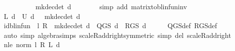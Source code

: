 \begin{isabellebody}
\ \ \ \ \isamarkupfalse%
\ \isamarkupfalse%
\ {\isachardoublequoteopen}{\isasymdots}\ {\isacharequal}{\kern0pt}\ {\isacharparenleft}{\kern0pt}{\isasymP}\ {\isacharparenleft}{\kern0pt}mk{\isacharunderscore}{\kern0pt}dec{\isacharunderscore}{\kern0pt}det\ d{\isacharparenright}{\kern0pt}{\isacharparenright}{\kern0pt}{\isachardoublequoteclose}\isanewline
\ \ \ \ \ \ \isamarkupfalse%
\ {\isacharparenleft}{\kern0pt}simp\ add{\isacharcolon}{\kern0pt}\ matrix{\isacharunderscore}{\kern0pt}to{\isacharunderscore}{\kern0pt}blinfun{\isacharunderscore}{\kern0pt}inv{\isacharparenright}{\kern0pt}\isanewline
\ \ \ \ \isamarkupfalse%
\ \isamarkupfalse%
\ {\isachardoublequoteopen}{\isasymP}\isactrlsub L\ d\ {\isacharplus}{\kern0pt}\ {\isasymP}\isactrlsub U\ d\ {\isacharequal}{\kern0pt}\ {\isasymP}\ {\isacharparenleft}{\kern0pt}mk{\isacharunderscore}{\kern0pt}dec{\isacharunderscore}{\kern0pt}det\ d{\isacharparenright}{\kern0pt}{\isachardoublequoteclose}\isacommand{{\isachardot}{\kern0pt}}\isamarkupfalse%
\isanewline
\ \ \isamarkupfalse%
\isanewline
\ \ \isamarkupfalse%
\ {\isachardoublequoteopen}id{\isacharunderscore}{\kern0pt}blinfun\ {\isacharminus}{\kern0pt}\ l\ {\isacharasterisk}{\kern0pt}\isactrlsub R\ {\isasymP}\ {\isacharparenleft}{\kern0pt}mk{\isacharunderscore}{\kern0pt}dec{\isacharunderscore}{\kern0pt}det\ d{\isacharparenright}{\kern0pt}\ {\isacharequal}{\kern0pt}\ Q{\isacharunderscore}{\kern0pt}GS\ d\ {\isacharminus}{\kern0pt}\ R{\isacharunderscore}{\kern0pt}GS\ d{\isachardoublequoteclose}\isanewline
\ \ \ \ \isamarkupfalse%
\ Q{\isacharunderscore}{\kern0pt}GS{\isacharunderscore}{\kern0pt}def\ R{\isacharunderscore}{\kern0pt}GS{\isacharunderscore}{\kern0pt}def\isanewline
\ \ \ \ \isamarkupfalse%
\ {\isacharparenleft}{\kern0pt}auto\ simp{\isacharcolon}{\kern0pt}\ algebra{\isacharunderscore}{\kern0pt}simps\ scaleR{\isacharunderscore}{\kern0pt}add{\isacharunderscore}{\kern0pt}right{\isacharbrackleft}{\kern0pt}symmetric{\isacharbrackright}{\kern0pt}\ simp\ del{\isacharcolon}{\kern0pt}\ scaleR{\isacharunderscore}{\kern0pt}add{\isacharunderscore}{\kern0pt}right{\isacharparenright}{\kern0pt}\isanewline
{}\isamarkupfalse%
\isanewline
\ \ \isamarkupfalse%
\ n{\isacharunderscore}{\kern0pt}le{\isacharcolon}{\kern0pt}\ {\isachardoublequoteopen}norm\ {\isacharparenleft}{\kern0pt}l\ {\isacharasterisk}{\kern0pt}\isactrlsub R\ {\isasymP}\isactrlsub L\ d{\isacharparenright}{\kern0pt}\ {\isacharless}{\kern0pt}\ {}{\isachardoublequoteclose}\isanewline

\end{isabellebody}

